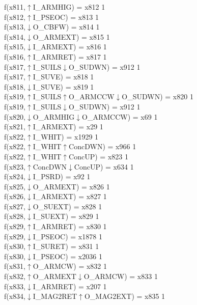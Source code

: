 f(x811,$\uparrow$I\_ARMHIG) = x812 {1} \\
f(x812,$\uparrow$I\_PSEOC) = x813 {1} \\
f(x813,$\downarrow$O\_CBFW) = x814 {1} \\
f(x814,$\downarrow$O\_ARMEXT) = x815 {1} \\
f(x815,$\downarrow$I\_ARMEXT) = x816 {1} \\
f(x816,$\uparrow$I\_ARMRET) = x817 {1} \\
f(x817,$\uparrow$I\_SUILS$\downarrow$O\_SUDWN) = x912 {1} \\
f(x817,$\uparrow$I\_SUVE) = x818 {1} \\
f(x818,$\downarrow$I\_SUVE) = x819 {1} \\
f(x819,$\uparrow$I\_SUILS$\uparrow$O\_ARMCCW$\downarrow$O\_SUDWN) = x820 {1} \\
f(x819,$\uparrow$I\_SUILS$\downarrow$O\_SUDWN) = x912 {1} \\
f(x820,$\downarrow$O\_ARMHIG$\downarrow$O\_ARMCCW) = x69 {1} \\
f(x821,$\uparrow$I\_ARMEXT) = x29 {1} \\
f(x822,$\uparrow$I\_WHIT) = x1929 {1} \\
f(x822,$\uparrow$I\_WHIT$\uparrow$ConcDWN) = x966 {1} \\
f(x822,$\uparrow$I\_WHIT$\uparrow$ConcUP) = x823 {1} \\
f(x823,$\uparrow$ConcDWN$\downarrow$ConcUP) = x634 {1} \\
f(x824,$\downarrow$I\_PSRD) = x92 {1} \\
f(x825,$\downarrow$O\_ARMEXT) = x826 {1} \\
f(x826,$\downarrow$I\_ARMEXT) = x827 {1} \\
f(x827,$\downarrow$O\_SUEXT) = x828 {1} \\
f(x828,$\downarrow$I\_SUEXT) = x829 {1} \\
f(x829,$\uparrow$I\_ARMRET) = x830 {1} \\
f(x829,$\downarrow$I\_PSEOC) = x1878 {1} \\
f(x830,$\uparrow$I\_SURET) = x831 {1} \\
f(x830,$\downarrow$I\_PSEOC) = x2036 {1} \\
f(x831,$\uparrow$O\_ARMCW) = x832 {1} \\
f(x832,$\uparrow$O\_ARMEXT$\downarrow$O\_ARMCW) = x833 {1} \\
f(x833,$\downarrow$I\_ARMRET) = x207 {1} \\
f(x834,$\downarrow$I\_MAG2RET$\uparrow$O\_MAG2EXT) = x835 {1} \\
